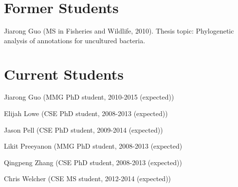 \documentclass[margin,line]{resume}
\begin{document}
\begin{resume}
\section{\mysidestyle Former Students}

Jiarong Guo (MS in Fisheries and Wildlife, 2010).  Thesis topic:
Phylogenetic analysis of annotations for uncultured bacteria.

\section{\mysidestyle Current Students}

\begin{list1}
\item[] Jiarong Guo (MMG PhD student, 2010-2015 (expected))
\item[] Elijah Lowe (CSE PhD student, 2008-2013 (expected))
\item[] Jason Pell (CSE PhD student, 2009-2014 (expected))
\item[] Likit Preeyanon (MMG PhD student, 2008-2013 (expected)
\item[] Qingpeng Zhang (CSE PhD student, 2008-2013 (expected))
\item[] Chris Welcher (CSE MS student, 2012-2014 (expected))
\end{list1}

\end{resume}
\end{document}
